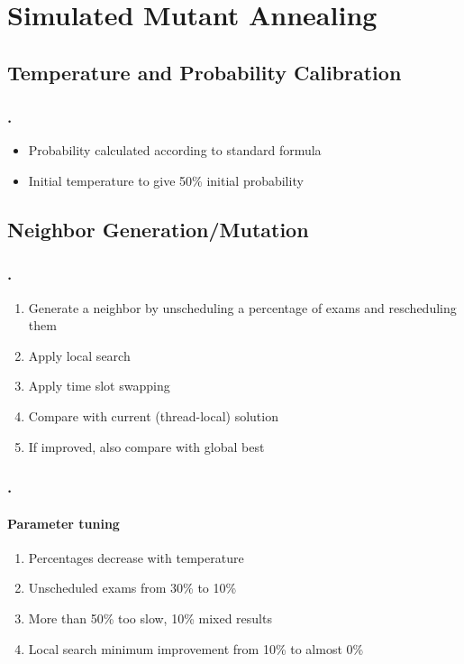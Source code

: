 \documentclass{beamer}
\begin{document}
\section{Simulated Mutant Annealing}

\subsection{Temperature and Probability Calibration}

\begin{frame}
\frametitle{\thesection.\thesubsection \ \insertsubsection}
\begin{itemize}
	\item Probability calculated according to standard formula
	\item Initial temperature to give 50\% initial probability
\end{itemize}
\end{frame}

\subsection{Neighbor Generation/Mutation}

\begin{frame}
\frametitle{\thesection.\thesubsection \ \insertsubsection}
\begin{enumerate}
	\item Generate a neighbor by unscheduling a percentage of exams and rescheduling them
	\item Apply local search
	\item Apply time slot swapping
	\item Compare with current (thread-local) solution
	\item If improved, also compare with global best
\end{enumerate}
\end{frame}

\begin{frame}
\frametitle{\thesection.\thesubsection \ \insertsubsection}
\framesubtitle{Parameter tuning}
\begin{enumerate}
	\item Percentages decrease with temperature %
	\item Unscheduled exams from 30\% to 10\%
	\item More than 50\% too slow, 10\% mixed results %
	\item Local search minimum improvement from 10\% to almost 0\%
\end{enumerate}
\end{frame}
\end{document}
